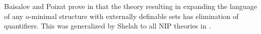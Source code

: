 \documentclass[12pt]{article}
\theoremstyle{definition}
\theoremstyle{mystyle}
\theoremstyle{remark}
\newtheorem{lemma}[thm]{Lemma}
\begin{document}
Baisalov and Poizat prove in \cite{BaPo} that the theory
resulting in expanding the language of any o-minimal structure
with externally definable sets has elimination of
quantifiers. This was generalized by Shelah to all NIP theories in
\cite{Sh783}.

%
\end{document}
